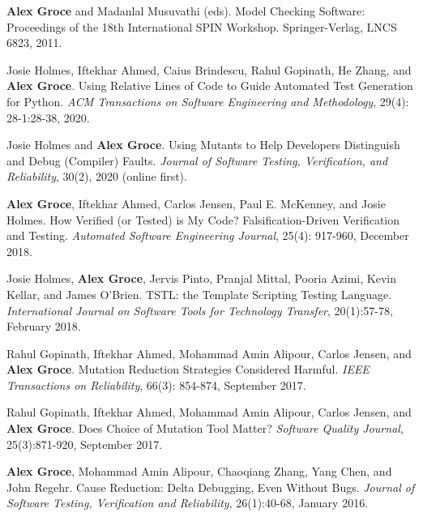 \documentclass[ComputerScience]{vita}
\begin{document}
\begin{vita}
\begin{Books, Edited Volumes}
\item
{\bf Alex Groce} and Madanlal Musuvathi (eds).
\newblock Model Checking Software: Proceedings of the 18th International SPIN Workshop.
\newblock Springer-Verlag, LNCS 6823, 2011. 

\end{Books, Edited Volumes}

\begin{Refereed Journal Publications}
\item
Josie Holmes, Iftekhar Ahmed, Caius Brindescu, Rahul Gopinath, He
Zhang, and {\bf Alex Groce}.
\newblock Using Relative Lines of Code to Guide Automated Test
Generation for Python.
\newblock \emph{ACM Transactions on Software Engineering and
  Methodology}, 29(4): 28-1:28-38, 2020.
  
\item
Josie Holmes and {\bf Alex Groce}.
\newblock Using Mutants to Help Developers Distinguish and Debug (Compiler) Faults.
\newblock \emph{Journal of Software Testing, Verification, and
  Reliability}, 30(2), 2020 (online first).

\item
{\bf Alex Groce}, Iftekhar Ahmed, Carlos Jensen, Paul E. McKenney, and
Josie Holmes.
\newblock How Verified (or Tested) is My Code? Falsification-Driven Verification and Testing.
\newblock \emph{Automated Software Engineering Journal}, 25(4):
917-960, December 2018.

\item
Josie Holmes, {\bf Alex Groce}, Jervis Pinto, Pranjal Mittal, Pooria Azimi, Kevin Kellar, and James O'Brien.
\newblock TSTL: the Template Scripting Testing Language.
\newblock \emph{International Journal on Software Tools for Technology Transfer}, 20(1):57-78, February 2018.


\item
Rahul Gopinath, Iftekhar Ahmed, Mohammad Amin Alipour, Carlos Jensen, and {\bf Alex Groce}.
\newblock Mutation Reduction Strategies Considered Harmful.
\newblock \emph{IEEE Transactions on Reliability}, 66(3): 854-874, September 2017.


\item
Rahul Gopinath, Iftekhar Ahmed, Mohammad Amin Alipour, Carlos Jensen, and {\bf Alex Groce}.
\newblock Does Choice of Mutation Tool Matter?
\newblock \emph{Software Quality Journal}, 25(3):871-920, September 2017.

\item
{\bf Alex Groce}, Mohammad Amin Alipour, Chaoqiang Zhang, Yang Chen, and John Regehr.
\newblock Cause Reduction: Delta Debugging, Even Without Bugs.
\newblock \emph{Journal of Software Testing, Verification and Reliability}, 26(1):40-68, January 2016.


\end{Refereed Journal Publications}
\end{vita}
\end{document}
